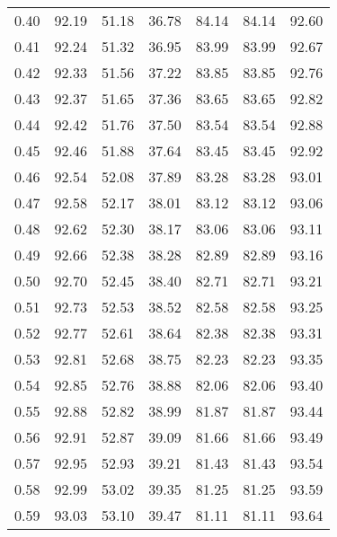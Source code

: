 \begin{tabular}{|c|c|c|c|c|c|c|}
      0.40 &     92.19 &     51.18 &      36.78 &   84.14 &      84.14 &         92.60 \\
      0.41 &     92.24 &     51.32 &      36.95 &   83.99 &      83.99 &         92.67 \\
      0.42 &     92.33 &     51.56 &      37.22 &   83.85 &      83.85 &         92.76 \\
      0.43 &     92.37 &     51.65 &      37.36 &   83.65 &      83.65 &         92.82 \\
      0.44 &     92.42 &     51.76 &      37.50 &   83.54 &      83.54 &         92.88 \\
      0.45 &     92.46 &     51.88 &      37.64 &   83.45 &      83.45 &         92.92 \\
      0.46 &     92.54 &     52.08 &      37.89 &   83.28 &      83.28 &         93.01 \\
      0.47 &     92.58 &     52.17 &      38.01 &   83.12 &      83.12 &         93.06 \\
      0.48 &     92.62 &     52.30 &      38.17 &   83.06 &      83.06 &         93.11 \\
      0.49 &     92.66 &     52.38 &      38.28 &   82.89 &      82.89 &         93.16 \\
      0.50 &     92.70 &     52.45 &      38.40 &   82.71 &      82.71 &         93.21 \\
      0.51 &     92.73 &     52.53 &      38.52 &   82.58 &      82.58 &         93.25 \\
      0.52 &     92.77 &     52.61 &      38.64 &   82.38 &      82.38 &         93.31 \\
      0.53 &     92.81 &     52.68 &      38.75 &   82.23 &      82.23 &         93.35 \\
      0.54 &     92.85 &     52.76 &      38.88 &   82.06 &      82.06 &         93.40 \\
      0.55 &     92.88 &     52.82 &      38.99 &   81.87 &      81.87 &         93.44 \\
      0.56 &     92.91 &     52.87 &      39.09 &   81.66 &      81.66 &         93.49 \\
      0.57 &     92.95 &     52.93 &      39.21 &   81.43 &      81.43 &         93.54 \\
      0.58 &     92.99 &     53.02 &      39.35 &   81.25 &      81.25 &         93.59 \\
      0.59 &     93.03 &     53.10 &      39.47 &   81.11 &      81.11 &         93.64 \\

\end{tabular}
